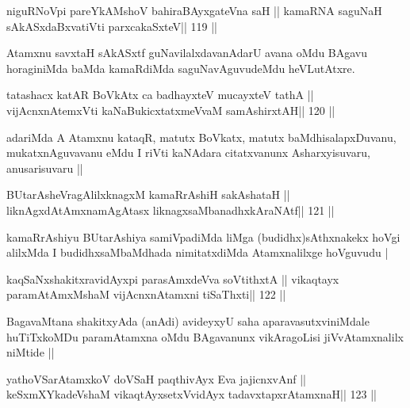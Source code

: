 
\begin{shl}
niguRNoV\s pi pareYkAMshoV bahiraBAyxgateVna saH ||
kamaRNA saguNaH sAkASxdaBxvatiVti parxcakaSxteV\hfill || 119 ||
\end{shl}

\begin{artha}
Atamxnu savxtaH sAkASxtf guNavilalxdavanAdarU avana oMdu BAgavu
horaginiMda baMda kamaRdiMda saguNavAguvudeMdu heVLutAtxre.
\end{artha}

\begin{shl}
tatashacx katAR BoVkAtx ca badhayxteV mucayxteV tathA ||
vijAcnxnAtemxVti kaNaBukicxtatxmeVvaM samAshirxtAH\hfill || 120 ||
\end{shl}

\begin{artha}
adariMda A Atamxnu kataqR, matutx BoVkatx, matutx baMdhisalapxDuvanu,
mukatxnAguvavanu eMdu I riVti kaNAdara citatxvanunx Asharxyisuvaru,
anusarisuvaru ||
\end{artha}

\begin{shl}
BUtarAsheVragAlilxknagxM kamaRrAshiH sakAshataH ||
liknAgxdAtAmxnamAgAtasx liknagxsaMbanadhxkAraNAtf\hfill || 121 ||
\end{shl}

\begin{artha}
kamaRrAshiyu BUtarAshiya samiVpadiMda liMga (budidhx)sAthxnakekx hoVgi
alilxMda I budidhxsaMbaMdhada nimitatxdiMda Atamxnalilxge  hoVguvudu |
\end{artha}


\begin{shl}
kaqSaNxshakitxravidAyx\s pi parasAmxdeVva soVtithxtA ||
vikaqtayx paramAtAmxMshaM vijAcnxnAtamxni tiSaThxti\hfill || 122 ||
\end{shl}

\begin{artha}
BagavaMtana shakitxyAda (anAdi) avideyxyU saha aparavasutxviniMdale
huTiTxkoMDu paramAtamxna oMdu BAgavanunx vikAragoLisi jiVvAtamxnalilx
niMtide ||
\end{artha}


\begin{shl}
yathoVSarAtamxkoV doVSaH paqthivAyx Eva jajicnxvAnf ||
keSxmXYkadeVshaM vikaqtAyx\s\s setxV\s vidAyx tadavxtapxrAtamxnaH\hfill || 123 ||
\end{shl}


